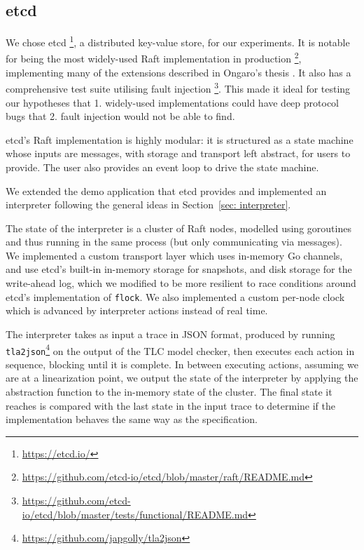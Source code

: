 \documentclass[a4paper]{article}
\begin{document}
\subsection{etcd}

We chose etcd \footnote{\url{https://etcd.io/}}, a distributed key-value store, for our experiments.
%
It is notable for being the most widely-used Raft implementation in production \footnote{\url{https://github.com/etcd-io/etcd/blob/master/raft/README.md}}, implementing many of the extensions described in Ongaro's thesis \cite{ongaro_consensus_2014}. It also has a comprehensive test suite utilising fault injection \footnote{\url{https://github.com/etcd-io/etcd/blob/master/tests/functional/README.md}}.
%
This made it ideal for testing our hypotheses that 1. widely-used implementations could have deep protocol bugs that 2. fault injection would not be able to find.

etcd's Raft implementation is highly modular: it is structured as a state machine whose inputs are messages, with storage and transport left abstract, for users to provide.
%
The user also provides an event loop to drive the state machine.

We extended the demo application that etcd provides and implemented an interpreter following the general ideas in Section~\ref{sec: interpreter}.

The state of the interpreter is a cluster of Raft nodes, modelled using goroutines and thus running in the same process (but only communicating via messages).
%
We implemented a custom transport layer which uses in-memory Go channels, and use etcd's built-in in-memory storage for snapshots, and disk storage for the write-ahead log, which we modified to be more resilient to race conditions around etcd's implementation of \texttt{flock}.
%
We also implemented a custom per-node clock which is advanced by interpreter actions instead of real time.

The interpreter takes as input a trace in JSON format, produced by running \texttt{tla2json}\footnote{\url{https://github.com/japgolly/tla2json}} on the output of the TLC model checker, then executes each action in sequence, blocking until it is complete.
%
In between executing actions, assuming we are at a linearization point, we output the state of the interpreter by applying the abstraction function to the in-memory state of the cluster.
%
The final state it reaches is compared with the last state in the input trace to determine if the implementation behaves the same way as the specification.
\end{document}
